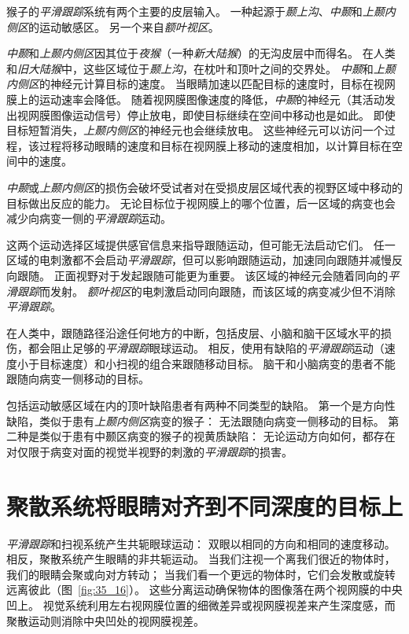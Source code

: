 猴子的\textit{平滑跟踪}系统有两个主要的皮层输入。
一种起源于\textit{颞上沟}、\textit{中颞}和\textit{上颞内侧区}的运动敏感区。
另一个来自\textit{额叶视区}。


\textit{中颞}和\textit{上颞内侧区}因其位于\textit{夜猴}（一种\textit{新大陆猴}）的无沟皮层中而得名。
在人类和\textit{旧大陆猴}中，这些区域位于\textit{颞上沟}，在枕叶和顶叶之间的交界处。
\textit{中颞}和\textit{上颞内侧区}的神经元计算目标的速度。
当眼睛加速以匹配目标的速度时，目标在视网膜上的运动速率会降低。
随着视网膜图像速度的降低，\textit{中颞}的神经元（其活动发出视网膜图像运动信号）停止放电，即使目标继续在空间中移动也是如此。
即使目标短暂消失，\textit{上颞内侧区}的神经元也会继续放电。
这些神经元可以访问一个过程，该过程将移动眼睛的速度和目标在视网膜上移动的速度相加，以计算目标在空间中的速度。


\textit{中颞}或\textit{上颞内侧区}的损伤会破坏受试者对在受损皮层区域代表的视野区域中移动的目标做出反应的能力。
无论目标位于视网膜上的哪个位置，后一区域的病变也会减少向病变一侧的\textit{平滑跟踪}运动。


这两个运动选择区域提供感官信息来指导跟随运动，但可能无法启动它们。
任一区域的电刺激都不会启动\textit{平滑跟踪}，但可以影响跟随运动，加速同向跟随并减慢反向跟随。
正面视野对于发起跟随可能更为重要。
该区域的神经元会随着同向的\textit{平滑跟踪}而发射。
\textit{额叶视区}的电刺激启动同向跟随，而该区域的病变减少但不消除\textit{平滑跟踪}。


在人类中，跟随路径沿途任何地方的中断，包括皮层、小脑和脑干区域水平的损伤，都会阻止足够的\textit{平滑跟踪}眼球运动。
相反，使用有缺陷的\textit{平滑跟踪}运动（速度小于目标速度）和小扫视的组合来跟随移动目标。
脑干和小脑病变的患者不能跟随向病变一侧移动的目标。


包括运动敏感区域在内的顶叶缺陷患者有两种不同类型的缺陷。
第一个是方向性缺陷，类似于患有\textit{上颞内侧区}病变的猴子：
无法跟随向病变一侧移动的目标。
第二种是类似于患有中颞区病变的猴子的视黄质缺陷：
无论运动方向如何，都存在对仅限于病变对面的视觉半视野的刺激的\textit{平滑跟踪}的损害。



\section{聚散系统将眼睛对齐到不同深度的目标上}

\textit{平滑跟踪}和扫视系统产生共轭眼球运动：
双眼以相同的方向和相同的速度移动。
相反，聚散系统产生眼睛的非共轭运动。
当我们注视一个离我们很近的物体时，我们的眼睛会聚或向对方转动；
当我们看一个更远的物体时，它们会发散或旋转远离彼此（图~\ref{fig:35_16}）。
这些分离运动确保物体的图像落在两个视网膜的中央凹上。
视觉系统利用左右视网膜位置的细微差异或视网膜视差来产生深度感，而聚散运动则消除中央凹处的视网膜视差。


